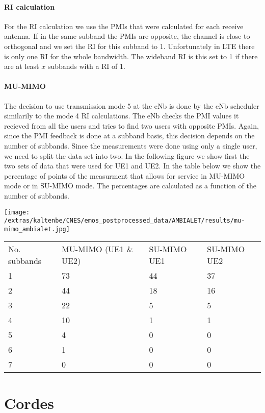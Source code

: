 \documentclass[a4paper,10pt]{article}
\begin{document}
\paragraph{RI calculation}
For the RI calculation we use the PMIs that were calculated for each receive antenna. If in the same subband the PMIs are opposite, the channel is close to orthogonal and we set the RI for this subband to 1. Unfortunately in LTE there is only one RI for the whole bandwidth. The wideband RI is this set to 1 if there are at least $x$ subbands with a RI of 1. 

\paragraph{MU-MIMO}
The decision to use transmission mode 5 at the eNb is done by the eNb scheduler similarily to the mode 4 RI calculations. The eNb checks the PMI values it recieved from all the users and tries to find two users with opposite PMIs. Again, since the PMI feedback is done at a subband basis, this decision depends on the number of subbands. Since the measurements were done using only a single user, we need to split the data set into two. 
In the following figure we show first the two sets of data that were used for UE1 and UE2. In the table below we show the percentage of points of the measurment that allows for service in MU-MIMO mode or in SU-MIMO mode. The percentages are calculated as a function of the number of subbands.


\begin{minipage}{16cm}
  \centering
  \texttt{[image: /extras/kaltenbe/CNES/emos\_postprocessed\_data/AMBIALET/results/mu-mimo\_ambialet.jpg]}
  
\begin{tabular}{llll}
No. subbands & MU-MIMO (UE1 \& UE2) & SU-MIMO UE1 & SU-MIMO UE2 \\ 
1 & 73 & 44 & 37 \\ 
2 & 44 & 18 & 16 \\ 
3 & 22 & 5 & 5 \\ 
4 & 10 & 1 & 1 \\ 
5 & 4 & 0 & 0 \\ 
6 & 1 & 0 & 0 \\ 
7 & 0 & 0 & 0
\end{tabular}
\end{minipage}


\section{Cordes}
\label{sec:cordes}
\end{document}
